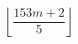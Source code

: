 \documentclass{article}
\begin{document}
\pagestyle{empty}
\[
\left\lfloor\frac{153m+2}{5}\right\rfloor
\]
\end{document}
